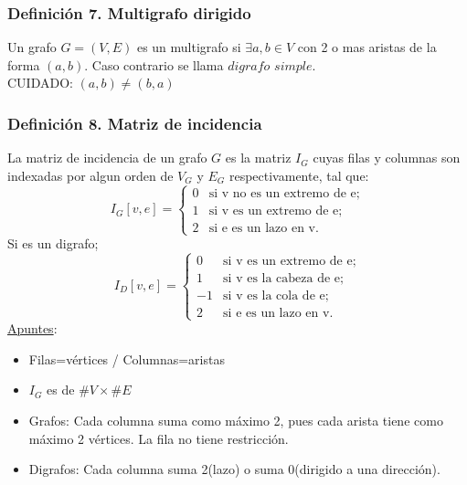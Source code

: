 \documentclass{article}
\begin{document}
\subsubsection*{Definición 7. Multigrafo dirigido}
Un grafo $G=(V,E)$ es un multigrafo si $\exists a, b \in V$ con 2 o mas aristas de la forma $(a,b)$. 
Caso contrario se llama $digrafo$ $simple$.
\\CUIDADO: $(a,b) \neq (b,a)$

\subsubsection*{Definición 8. Matriz de incidencia}
La matriz de incidencia de un grafo $G$ es la matriz $I_G$ cuyas filas y columnas son indexadas por algun orden
de $V_G$ y $E_G$ respectivamente, tal que:
\begin{equation*}
    I_G[v,e]=
    \begin{cases}
        0 &\text{si v no es un extremo de e;} \\
        1 &\text{si v es un extremo de e;} \\ 
        2 &\text{si e es un lazo en v.}
    \end{cases}
\end{equation*}
Si es un digrafo;
\begin{equation*}
    I_D[v,e]=
    \begin{cases}
        0 &\text{si v es un extremo de e;} \\
        1 &\text{si v es la cabeza de e;} \\ 
        -1 &\text{si v es la cola de e;} \\ 
        2 &\text{si e es un lazo en v.}
    \end{cases}
\end{equation*}
\underline{Apuntes}:
\begin{itemize}
        \item Filas=vértices / Columnas=aristas
        \item $I_G$ es de $\#V \times \#E$
        \item Grafos: Cada columna suma como máximo 2, pues cada arista tiene como máximo 2 vértices. La fila no tiene restricción.
        \item Digrafos: Cada columna suma 2(lazo) o suma 0(dirigido a una dirección).
\end{itemize}
\end{document}
